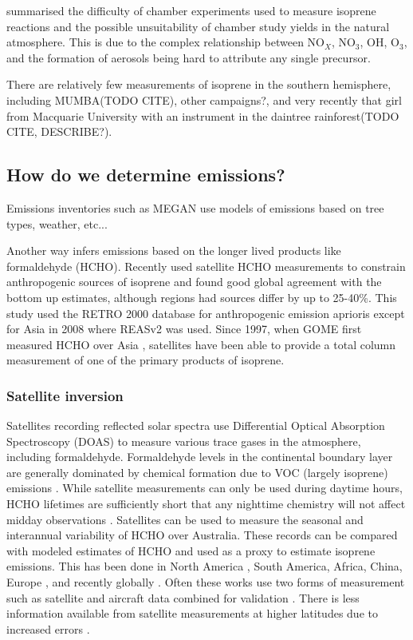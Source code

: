     
    \cite{Kanakidou2005} summarised the difficulty of chamber experiments used to measure isoprene reactions and the possible unsuitability of chamber study yields in the natural atmosphere.
    This is due to the complex relationship between NO$_X$, NO$_3$, OH, O$_3$, and the formation of aerosols being hard to attribute any single precursor.
    
    
    
    There are relatively few measurements of isoprene in the southern hemisphere, including MUMBA(TODO CITE), other campaigns?, and very recently that girl from Macquarie University with an instrument in the daintree rainforest(TODO CITE, DESCRIBE?).
    
  
  \subsection{How do we determine emissions?}
    Emissions inventories such as MEGAN use models of emissions based on tree types, weather, etc... 
    
    Another way infers emissions based on the longer lived products like formaldehyde (HCHO).
    Recently \cite{Stavrakou2015} used satellite HCHO measurements to constrain anthropogenic sources of isoprene and found good global agreement with the bottom up estimates, although regions had sources differ by up to 25-40\%. 
    This study used the RETRO 2000 database for anthropogenic emission aprioris except for Asia in 2008 where REASv2 was used. 
    Since 1997, when GOME first measured HCHO over Asia \citep{Thomas1998}, satellites have been able to provide a total column measurement of one of the primary products of isoprene.
    
    \subsubsection{Satellite inversion}
	    Satellites recording reflected solar spectra use Differential Optical Absorption Spectroscopy (DOAS) to measure various trace gases in the atmosphere, including formaldehyde. 
	    Formaldehyde levels in the continental boundary layer are generally dominated by chemical formation due to VOC (largely isoprene) emissions \citep{Kefauver2014}.
	    While satellite measurements can only be used during daytime hours, HCHO lifetimes are sufficiently short that any nighttime chemistry will not affect midday observations \citep{Wolfe2016}.
	    Satellites can be used to measure the seasonal and interannual variability of HCHO over Australia.
	    These records can be compared with modeled estimates of HCHO and used as a proxy to estimate isoprene emissions.
	    This has been done in North America \citep{Palmer2003, Millet2006}, South America, Africa, China, Europe \citep{Dufour2009}, and recently globally \citep{FortemsCheiney2012, Bauwens2016}.
	    Often these works use two forms of measurement such as satellite and aircraft data combined for validation \citep{Marais2014}.
	    There is less information available from satellite measurements at higher latitudes due to increased errors \citep{DeSmedt2015}.
	    
